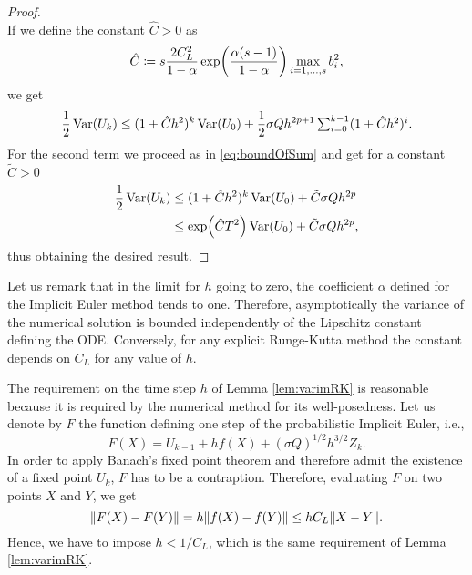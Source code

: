 \begin{proof}
\begin{equation}
\end{equation}
If we define the constant $\hat C > 0$ as 
\begin{equation}
\hat C \coloneqq s\frac{2C_L^2}{1 - \alpha}\exp(\frac{\alpha(s-1)}{1-\alpha})\max_{i=1,\ldots,s} b_i^2,
\end{equation}
we get
\begin{equation}
\frac{1}{2}\operatorname{Var}(U_k) \leq (1 + \hat C h^2)^k \operatorname{Var}(U_0) + \frac{1}{2} \sigma Qh^{2p+1}\textstyle\sum_{i=0}^{k-1} (1 + \hat C h^2)^i.
\end{equation}
For the second term we proceed as in \eqref{eq:boundOfSum} and get for a constant $\tilde C > 0$ \\
\begin{equation}
\begin{aligned}
\frac{1}{2}\operatorname{Var}(U_k) &\leq (1 + \hat C h^2)^k \operatorname{Var}(U_0) + \tilde C \sigma Q h^{2p} \\
&\leq \exp(\hat C T^2)\operatorname{Var}(U_0) + \tilde C \sigma Q h^{2p},
\end{aligned}
\end{equation}
thus obtaining the desired result.
\end{proof}
\begin{remark} Let us remark that in the limit for $h$ going to zero, the coefficient $\alpha$ defined for the Implicit Euler method tends to one. Therefore, asymptotically the variance of the numerical solution is bounded independently of the Lipschitz constant defining the ODE. Conversely, for any explicit Runge-Kutta method the constant depends on $C_L$ for any value of $h$.
\end{remark}
\begin{remark} The requirement on the time step $h$ of Lemma \ref{lem:varimRK} is reasonable because it is required by the numerical method for its well-posedness. Let us denote by $F$ the function defining one step of the probabilistic Implicit Euler, i.e., 
	\begin{equation}
	F(X) = U_{k-1} + hf(X) + (\sigma Q)^{1/2} h^{3/2}Z_k.
	\end{equation}
	In order to apply Banach's fixed point theorem and therefore admit the existence of a fixed point $U_{k}$, $F$ has to be a contraption. Therefore, evaluating $F$ on two points $X$ and $Y$, we get
	\begin{equation}
	\norm{F(X) - F(Y)} = h\norm{f(X) - f(Y)} \leq hC_L \norm{X - Y}.
	\end{equation}
	Hence, we have to impose $h < 1 / C_L$, which is the same requirement of Lemma \ref{lem:varimRK}. 
\end{remark}

